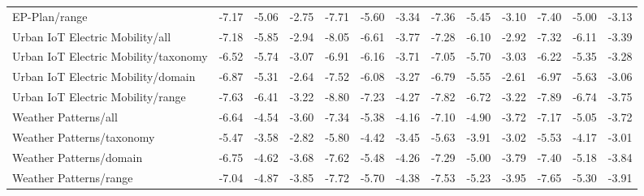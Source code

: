 \begin{tabular}{lcccccccccccc}
EP-Plan/range & -7.17 & -5.06 & -2.75 & -7.71 & -5.60 & -3.34 & -7.36 & -5.45 & -3.10 & -7.40 & -5.00 & -3.13 \\
Urban IoT Electric Mobility/all & -7.18 & -5.85 & -2.94 & -8.05 & -6.61 & -3.77 & -7.28 & -6.10 & -2.92 & -7.32 & -6.11 & -3.39 \\
Urban IoT Electric Mobility/taxonomy & -6.52 & -5.74 & -3.07 & -6.91 & -6.16 & -3.71 & -7.05 & -5.70 & -3.03 & -6.22 & -5.35 & -3.28 \\
Urban IoT Electric Mobility/domain & -6.87 & -5.31 & -2.64 & -7.52 & -6.08 & -3.27 & -6.79 & -5.55 & -2.61 & -6.97 & -5.63 & -3.06 \\
Urban IoT Electric Mobility/range & -7.63 & -6.41 & -3.22 & -8.80 & -7.23 & -4.27 & -7.82 & -6.72 & -3.22 & -7.89 & -6.74 & -3.75 \\
Weather Patterns/all & -6.64 & -4.54 & -3.60 & -7.34 & -5.38 & -4.16 & -7.10 & -4.90 & -3.72 & -7.17 & -5.05 & -3.72 \\
Weather Patterns/taxonomy & -5.47 & -3.58 & -2.82 & -5.80 & -4.42 & -3.45 & -5.63 & -3.91 & -3.02 & -5.53 & -4.17 & -3.01 \\
Weather Patterns/domain & -6.75 & -4.62 & -3.68 & -7.62 & -5.48 & -4.26 & -7.29 & -5.00 & -3.79 & -7.40 & -5.18 & -3.84 \\
Weather Patterns/range & -7.04 & -4.87 & -3.85 & -7.72 & -5.70 & -4.38 & -7.53 & -5.23 & -3.95 & -7.65 & -5.30 & -3.91 \\
\bottomrule
\end{tabular}
